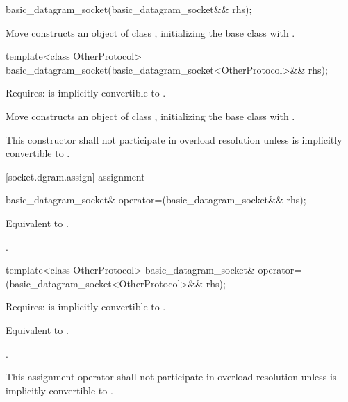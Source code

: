 \begin{itemdecl}
basic_datagram_socket(basic_datagram_socket&& rhs);
\end{itemdecl}

\begin{itemdescr}
\pnum
\effects Move constructs an object of class , initializing the base class with .
\end{itemdescr}

\begin{itemdecl}
template<class OtherProtocol>
  basic_datagram_socket(basic_datagram_socket<OtherProtocol>&& rhs);
\end{itemdecl}

\begin{itemdescr}
\pnum
Requires:  is implicitly convertible to .

\pnum
\effects Move constructs an object of class , initializing the base class with .

\pnum
\remarks This constructor shall not participate in overload resolution unless  is implicitly convertible to .
\end{itemdescr}



[socket.dgram.assign]{ assignment}

\begin{itemdecl}
basic_datagram_socket& operator=(basic_datagram_socket&& rhs);
\end{itemdecl}

\begin{itemdescr}
\pnum
\effects Equivalent to .

\pnum
\returns {}.
\end{itemdescr}

\begin{itemdecl}
template<class OtherProtocol>
  basic_datagram_socket& operator=(basic_datagram_socket<OtherProtocol>&& rhs);
\end{itemdecl}

\begin{itemdescr}
\pnum
Requires:  is implicitly convertible to .

\pnum
\effects Equivalent to .

\pnum
\returns {}.

\pnum
\remarks This assignment operator shall not participate in overload resolution unless  is implicitly convertible to .
\end{itemdescr}



